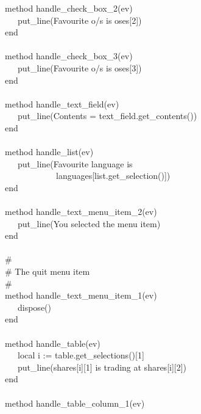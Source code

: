{\>   method handle\_check\_box\_2(ev) \\
\>   \ \ \ put\_line({\textquotedbl}Favourite o/s is {\textquotedbl}
{\textbar}{\textbar} oses[2]) \\
\>   end \\
\ \\
\>   method handle\_check\_box\_3(ev) \\
\>   \ \ \ put\_line({\textquotedbl}Favourite o/s is {\textquotedbl}
{\textbar}{\textbar} oses[3]) \\
\>   end \\
\ \\
\>   method handle\_text\_field(ev) \\
\>   \ \ \ put\_line({\textquotedbl}Contents = {\textquotedbl}
{\textbar}{\textbar} text\_field.get\_contents()) \\
\>   end \\
\ \\
\>   method handle\_list(ev) \\
\>   \ \ \ put\_line({\textquotedbl}Favourite language is
{\textquotedbl} {\textbar}{\textbar} \\
\>   \ \ \ \ \ \ \ \ \ \ \ \ languages[list.get\_selection()]) \\
\>   end \\
\ \\
\>   method handle\_text\_menu\_item\_2(ev) \\
\>   \ \ \ put\_line({\textquotedbl}You selected the menu
item{\textquotedbl}) \\
\>   end \\
\ \\
\>   \# \\
\>   \# The quit menu item \\
\>   \# \\
\>   method handle\_text\_menu\_item\_1(ev) \\
\>   \ \ \ dispose() \\
\>   end \\
\ \\
\>   method handle\_table(ev) \\
\>   \ \ \ local i := table.get\_selections()[1] \\
\>   \ \ \ put\_line(shares[i][1] {\textbar}{\textbar} {\textquotedbl}
is trading at {\textquotedbl} {\textbar}{\textbar} shares[i][2]) \\
\>   end \\
\ \\
\>   method handle\_table\_column\_1(ev) \\
}
